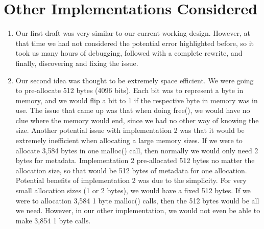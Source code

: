 \documentclass{article}
\begin{document}
    \section*{Other Implementations Considered}
    \begin{enumerate}
        \item
            Our first draft was very similar to our current working design. However, at that time we had not considered the potential error highlighted before, so it took us many hours of debugging, followed with a complete rewrite, and finally, discovering and fixing the issue.
        \item
            Our second idea was thought to be extremely space efficient. We were going to pre-allocate 512 bytes (4096 bits). Each bit was to represent a byte in memory, and we would flip a bit to 1 if the respective byte in memory was in use. The issue that came up was that when doing free(), we would have no clue where the memory would end, since we had no other way of knowing the size. Another potential issue with implementation 2 was that it would be extremely inefficient when allocating a large memory sizes. If we were to allocate 3,584 bytes in one malloc() call, then normally we would only need 2 bytes for metadata. Implementation 2 pre-allocated 512 bytes no matter the allocation size, so that would be 512 bytes of metadata for one allocation. Potential benefits of implementation 2 was due to the simplicity. For very small allocation sizes (1 or 2 bytes), we would have a fixed 512 bytes. If we were to allocation 3,584 1 byte malloc() calls, then the 512 bytes would be all we need. However, in our other implementation, we would not even be able to make 3,854 1 byte calls.        
    \end{enumerate}
\end{document}

